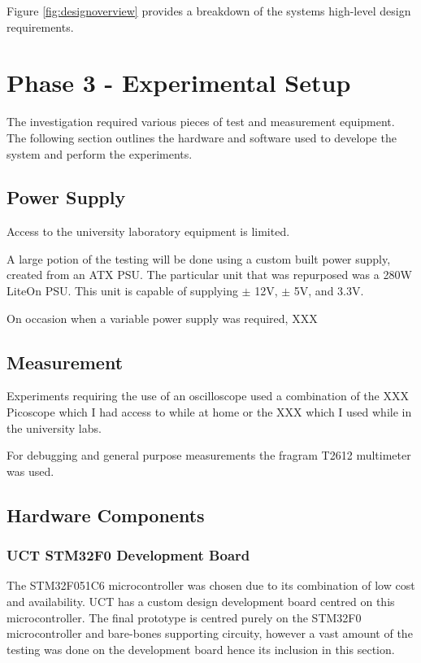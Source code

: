 Figure \ref{fig:designoverview} provides a breakdown of the systems high-level design requirements.



\section{Phase 3 - Experimental Setup}

The investigation required various pieces of test and measurement equipment. The following section outlines the hardware and software used to develope the system and perform the experiments.

\subsection{Power Supply}
Access to the university laboratory equipment is limited.

A large potion of the testing will be done using a custom built power supply, created from an ATX PSU. The particular unit that was repurposed was a 280W LiteOn PSU. This unit is capable of supplying $\pm$ 12V, $\pm$ 5V, and 3.3V.

On occasion when a variable power supply was required, XXX

\subsection{Measurement}

Experiments requiring the use of an oscilloscope used a combination of the XXX Picoscope which I had access to while at home or the XXX which I used while in the university labs.

For debugging and general purpose measurements the fragram T2612 multimeter was used.




\subsection{Hardware Components}

\subsubsection{UCT STM32F0 Development Board}
The STM32F051C6 microcontroller was chosen due to its combination of low cost and availability. UCT has a custom design development board centred on this microcontroller. The final prototype is centred purely on the STM32F0 microcontroller and bare-bones supporting circuity, however a vast amount of the testing was done on the development board hence its inclusion in this section.

